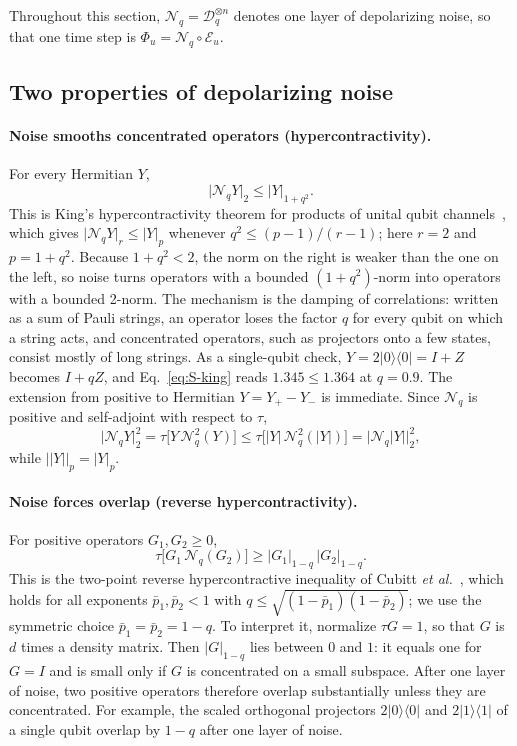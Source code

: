 \documentclass[aps,prl,twocolumn,superscriptaddress,floatfix]{revtex4-2}
\theoremstyle{plain}
\newcommand{\ketbra}[2]{|#1\rangle\!\langle #2|}
\newcommand{\nrm}[2]{\lvert #1\rvert_{#2}}
\newcommand{\cD}{\mathcal D}
\newcommand{\cE}{\mathcal E}
\newcommand{\Nq}{\mathcal N_q}
\begin{document}
Throughout this section, $\Nq=\cD_q^{\otimes n}$ denotes one layer of depolarizing noise, so that one time step is $\Phi_u=\Nq\circ\cE_u$.

\subsection{Two properties of depolarizing noise}
\label{sm:ineq}

\paragraph*{Noise smooths concentrated operators (hypercontractivity).} For every Hermitian $Y$,
\begin{equation}
\nrm{\Nq Y}2\le\nrm Y{1+q^2} .
\label{eq:S-king}
\end{equation}
This is King's hypercontractivity theorem for products of unital qubit channels~\cite[Corollary~2]{King2014}, which gives $\nrm{\Nq Y}r\le\nrm Yp$ whenever $q^2\le(p-1)/(r-1)$; here $r=2$ and $p=1+q^2$. Because $1+q^2<2$, the norm on the right is weaker than the one on the left, so noise turns operators with a bounded $(1+q^2)$-norm into operators with a bounded 2-norm. The mechanism is the damping of correlations: written as a sum of Pauli strings, an operator loses the factor $q$ for every qubit on which a string acts, and concentrated operators, such as projectors onto a few states, consist mostly of long strings. As a single-qubit check, $Y=2\ketbra00=I+Z$ becomes $I+qZ$, and Eq.~\eqref{eq:S-king} reads $1.345\le1.364$ at $q=0.9$. The extension from positive to Hermitian $Y=Y_+-Y_-$ is immediate. Since $\Nq$ is positive and self-adjoint with respect to $\tau$,
\[
\nrm{\Nq Y}2^2=\tau\bigl[Y\,\Nq^2(Y)\bigr]\le\tau\bigl[|Y|\,\Nq^2(|Y|)\bigr]=\nrm{\Nq|Y|}2^2,
\]
while $\nrm{|Y|}p=\nrm Yp$.

\paragraph*{Noise forces overlap (reverse hypercontractivity).} For positive operators $G_1,G_2\ge0$,
\begin{equation}
\tau\bigl[G_1\,\Nq(G_2)\bigr]\ge\nrm{G_1}{1-q}\,\nrm{G_2}{1-q} .
\label{eq:S-cubitt}
\end{equation}
This is the two-point reverse hypercontractive inequality of Cubitt \emph{et al.}~\cite[Corollary~14]{Cubitt2015}, which holds for all exponents $\bar p_1,\bar p_2<1$ with $q\le\sqrt{(1-\bar p_1)(1-\bar p_2)}$; we use the symmetric choice $\bar p_1=\bar p_2=1-q$. To interpret it, normalize $\tau G=1$, so that $G$ is $d$ times a density matrix. Then $\nrm G{1-q}$ lies between $0$ and $1$: it equals one for $G=I$ and is small only if $G$ is concentrated on a small subspace. After one layer of noise, two positive operators therefore overlap substantially unless they are concentrated. For example, the scaled orthogonal projectors $2\ketbra00$ and $2\ketbra11$ of a single qubit overlap by $1-q$ after one layer of noise.
\end{document}
